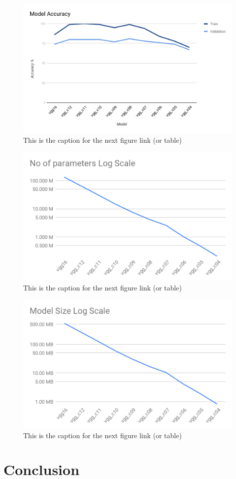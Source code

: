 \documentclass[a4paper,twocolumn]{article}
\begin{document}
\begin{figure}[htb]
\centering
\includegraphics[width=.9\linewidth]{./media/vgg16-cifar10/vgg16_cifar10_Acc.png}
\caption{\label{fig:SED-HR4049}This is the caption for the next figure link (or table)}
\end{figure}
\begin{figure}[htb]
\centering
\includegraphics[width=.9\linewidth]{./media/vgg16-cifar10/vgg16_cifar10_params_log.png}
\caption{\label{fig:SED-HR4049}This is the caption for the next figure link (or table)}
\end{figure}
\begin{figure}[htb]
\centering
\includegraphics[width=.9\linewidth]{./media/vgg16-cifar10/vgg16_cifar10_size_log.png}
\caption{\label{fig:SED-HR4049}This is the caption for the next figure link (or table)}
\end{figure}
\section{Conclusion}
\label{sec-6}


\printbibliography
\end{document}
